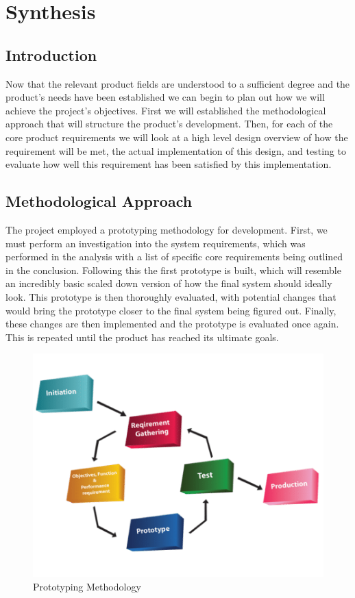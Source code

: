 \part{Synthesis}
	\chapter{Introduction}
	Now that the relevant product fields are understood to a sufficient degree and the product's needs have been established we can begin to plan out how we will achieve the project's objectives. First we will established the methodological approach that will structure the product's development. Then, for each of the core product requirements we will look at a high level design overview of how the requirement will be met, the actual implementation of this design, and testing to evaluate how well this requirement has been satisfied by this implementation.
	
	\chapter{Methodological Approach}
	\label{synthesis:methodology}
	The project employed a prototyping methodology for development. First, we must perform an investigation into the system requirements, which was performed in the analysis with a list of specific core requirements being outlined in the conclusion. Following this the first prototype is built, which will resemble an incredibly basic scaled down version of how the final system should ideally look. This prototype is then thoroughly evaluated, with potential changes that would bring the prototype closer to the final system being figured out. Finally, these changes are then implemented and the prototype is evaluated once again. This is repeated until the product has reached its ultimate goals.
	\begin{figure}[h]
		\centering
		\includegraphics[width=.8\linewidth]{SYNTHESIS/prototypingdiagram.png}
		\caption{Prototyping Methodology}
		\label{fig:prototypingdiagram}
	\end{figure}
	
